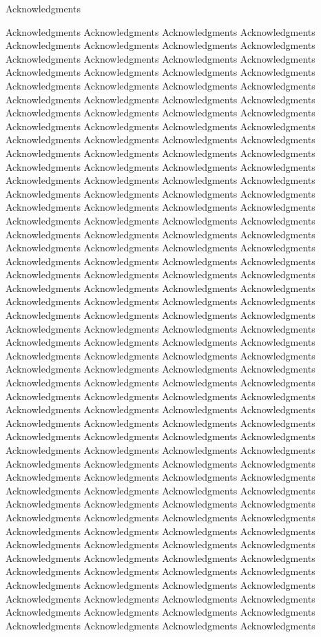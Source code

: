 \thispagestyle{empty}

\vspace*{20mm}

\begin{center}
{ Acknowledgments}
\end{center}

\vspace{10mm}

Acknowledgments Acknowledgments Acknowledgments Acknowledgments Acknowledgments Acknowledgments Acknowledgments Acknowledgments Acknowledgments Acknowledgments Acknowledgments Acknowledgments Acknowledgments Acknowledgments Acknowledgments Acknowledgments Acknowledgments Acknowledgments Acknowledgments Acknowledgments Acknowledgments Acknowledgments Acknowledgments Acknowledgments Acknowledgments Acknowledgments Acknowledgments Acknowledgments Acknowledgments Acknowledgments Acknowledgments Acknowledgments Acknowledgments Acknowledgments Acknowledgments Acknowledgments Acknowledgments Acknowledgments Acknowledgments Acknowledgments Acknowledgments Acknowledgments Acknowledgments Acknowledgments Acknowledgments Acknowledgments Acknowledgments Acknowledgments Acknowledgments Acknowledgments Acknowledgments Acknowledgments Acknowledgments Acknowledgments Acknowledgments Acknowledgments Acknowledgments Acknowledgments Acknowledgments Acknowledgments Acknowledgments Acknowledgments Acknowledgments Acknowledgments Acknowledgments Acknowledgments Acknowledgments Acknowledgments Acknowledgments Acknowledgments Acknowledgments Acknowledgments Acknowledgments Acknowledgments Acknowledgments Acknowledgments Acknowledgments Acknowledgments Acknowledgments Acknowledgments Acknowledgments Acknowledgments Acknowledgments Acknowledgments Acknowledgments Acknowledgments Acknowledgments Acknowledgments Acknowledgments Acknowledgments 
Acknowledgments Acknowledgments Acknowledgments Acknowledgments Acknowledgments Acknowledgments Acknowledgments Acknowledgments Acknowledgments Acknowledgments Acknowledgments Acknowledgments Acknowledgments Acknowledgments Acknowledgments Acknowledgments Acknowledgments Acknowledgments Acknowledgments Acknowledgments Acknowledgments Acknowledgments Acknowledgments Acknowledgments Acknowledgments Acknowledgments Acknowledgments Acknowledgments Acknowledgments Acknowledgments Acknowledgments Acknowledgments Acknowledgments Acknowledgments Acknowledgments Acknowledgments Acknowledgments Acknowledgments Acknowledgments Acknowledgments Acknowledgments Acknowledgments Acknowledgments Acknowledgments Acknowledgments Acknowledgments Acknowledgments Acknowledgments Acknowledgments Acknowledgments Acknowledgments Acknowledgments Acknowledgments Acknowledgments Acknowledgments Acknowledgments Acknowledgments Acknowledgments Acknowledgments Acknowledgments Acknowledgments Acknowledgments Acknowledgments Acknowledgments Acknowledgments Acknowledgments Acknowledgments Acknowledgments Acknowledgments Acknowledgments Acknowledgments Acknowledgments Acknowledgments Acknowledgments Acknowledgments Acknowledgments Acknowledgments Acknowledgments Acknowledgments Acknowledgments Acknowledgments Acknowledgments Acknowledgments Acknowledgments Acknowledgments Acknowledgments Acknowledgments Acknowledgments Acknowledgments Acknowledgments 
